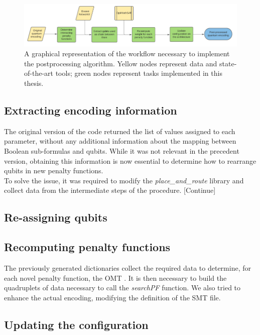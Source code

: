 \begin{figure}[t]
	\begin{center}
	\includegraphics[width=\textwidth]{images/Workflow.png}
	\caption{A graphical representation of the workflow necessary to implement the postprocessing algorithm. Yellow nodes represent data and state-of-the-art tools; green nodes represent tasks implemented in this thesis.}
	\end{center}
\end{figure}

\subsection{Extracting encoding information}

The original version of the code returned the list of values assigned to each parameter, without any additional information about the mapping between Boolean sub-formulas and qubits. While it was not relevant in the precedent version, obtaining this information is now essential to determine how to rearrange qubits in new penalty functions. \\
To solve the issue, it was required to modify the \textit{place\_and\_route} library and collect data from the intermediate steps of the procedure. [Continue]

\subsection{Re-assigning qubits}

\subsection{Recomputing penalty functions}

The previously generated dictionaries collect the required data to determine, for each novel penalty function, the OMT . It is then necessary to build the quadruplets of data necessary to call the \textit{searchPF} function.
We also tried to enhance the actual encoding, modifying the definition of the SMT file.

\subsection{Updating the configuration}

\pagebreak

